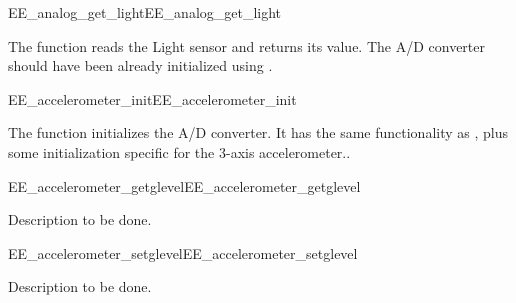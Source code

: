 \begin{function_nopb2}{EE\_analog\_get\_light}{EE_analog_get_light}
  
  \begin{fundescription}
    The function reads the Light sensor and returns its value. The
    A/D converter should have
    been already initialized using .
  \end{fundescription}
  
  \begin{funreturn}
  \end{funreturn}
\end{function_nopb2}





\begin{function_nopb2}{EE\_accelerometer\_init}{EE_accelerometer_init}
  
  \begin{fundescription}
    The function initializes the A/D converter. 
    It has the same functionality as , plus some
    initialization specific for the 3-axis accelerometer..
  \end{fundescription}
\end{function_nopb2}

\begin{function_nopb2}{EE\_accelerometer\_getglevel}{EE_accelerometer_getglevel}
  
  \begin{fundescription}
    Description to be done. 
  \end{fundescription}
  
  \begin{funreturn}
  \end{funreturn}
\end{function_nopb2}


\begin{function_nopb2}{EE\_accelerometer\_setglevel}{EE_accelerometer_setglevel}
  
  \begin{fundescription}
	Description to be done. 
  \end{fundescription}
  
  \begin{funreturn}
  \end{funreturn}
\end{function_nopb2}


